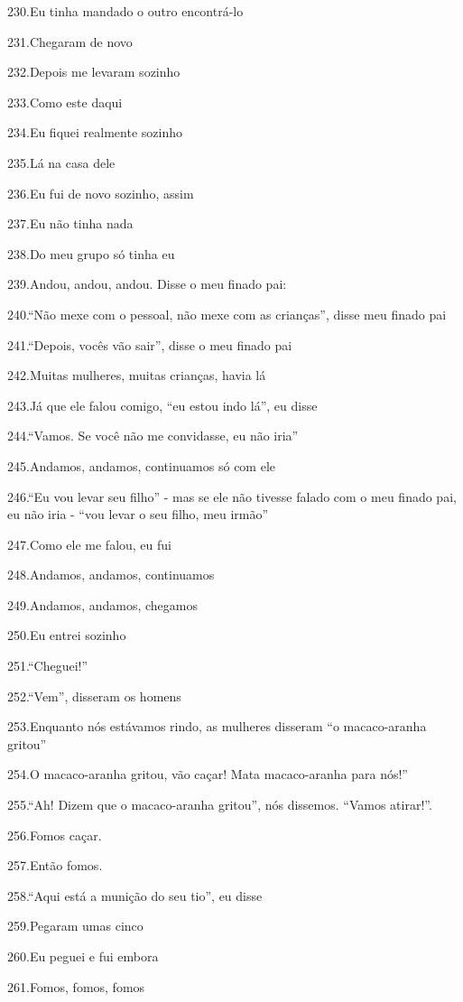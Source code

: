 230.Eu tinha mandado o outro encontrá-lo

231.Chegaram de novo

232.Depois me levaram sozinho

233.Como este daqui

234.Eu fiquei realmente sozinho

235.Lá na casa dele

236.Eu fui de novo sozinho, assim

237.Eu não tinha nada

238.Do meu grupo só tinha eu

239.Andou, andou, andou. Disse o meu finado pai:

240.``Não mexe com o pessoal, não mexe com as crianças'', disse meu
finado pai

241.``Depois, vocês vão sair'', disse o meu finado pai

242.Muitas mulheres, muitas crianças, havia lá

243.Já que ele falou comigo, ``eu estou indo lá'', eu disse

244.``Vamos. Se você não me convidasse, eu não iria''

245.Andamos, andamos, continuamos só com ele

246.``Eu vou levar seu filho'' - mas se ele não tivesse falado com o meu
finado pai, eu não iria - ``vou levar o seu filho, meu irmão''

247.Como ele me falou, eu fui

248.Andamos, andamos, continuamos

249.Andamos, andamos, chegamos

250.Eu entrei sozinho

251.``Cheguei!''

252.``Vem'', disseram os homens

253.Enquanto nós estávamos rindo, as mulheres disseram ``o macaco-aranha
gritou''

254.O macaco-aranha gritou, vão caçar! Mata macaco-aranha para nós!''

255.``Ah! Dizem que o macaco-aranha gritou'', nós dissemos. ``Vamos
atirar!''.

256.Fomos caçar.

257.Então fomos.

258.``Aqui está a munição do seu tio'', eu disse

259.Pegaram umas cinco

260.Eu peguei e fui embora

261.Fomos, fomos, fomos

